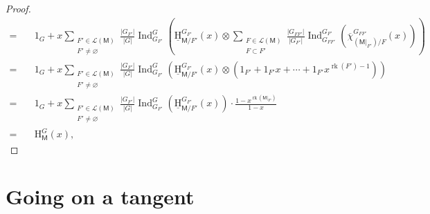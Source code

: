 \documentclass[11pt, a4paper, english]{amsart}
\theoremstyle{teoremas}
\theoremstyle{definition}
\DeclareMathOperator{\rk}{rk}
\newcommand{\M}{\mathsf{M}}
\renewcommand{\H}{\mathrm{H}}
\newcommand{\uH}{\underline{\mathrm{H}}}
\newcommand{\Ind}{\operatorname{Ind}}
\begin{document}
\begin{proof}
\begin{align}
        =\quad &1_G + x\sum_{\substack{F'\in \mathcal{L}(\M)\\F'\neq \varnothing}} \frac{|G_{F'}|}{|G|}\Ind_{G_{F'}}^G\left(\uH_{\M/F'}^{G_{F'}}(x) \otimes\sum_{\substack{F\in \mathcal{L}(\M)\\F\subset F'}} \frac{|G_{FF'}|}{|G_{F'}|}\Ind_{G_{FF'}}^{G_{F'}}\left(\overline{\chi}_{(\M|_{F'})/F}^{G_{FF'}}(x)\right)\right)\nonumber\\
        =\quad &1_G + x\sum_{\substack{F'\in \mathcal{L}(\M)\\F'\neq \varnothing}} \frac{|G_{F'}|}{|G|}\Ind_{G_{F'}}^G\left(\uH_{\M/F'}^{G_{F'}}(x) \otimes \left(1_{F'} + 1_{F'}x +\cdots + 1_{F'}x^{\rk(F')-1}\right)\right)\\
        =\quad &1_G + x\sum_{\substack{F'\in \mathcal{L}(\M)\\F'\neq \varnothing}} \frac{|G_{F'}|}{|G|}\Ind_{G_{F'}}^G\left(\uH_{\M/F'}^{G_{F'}}(x)\right) \cdot \frac{1-x^{\rk(\M|_{F'})}}{1-x} \label{eq:sum-char-poly}\\
        =\quad &\H_{\M}^G(x),\nonumber
    \end{align}
\end{proof}

\section{Going on a tangent}



\end{document}
